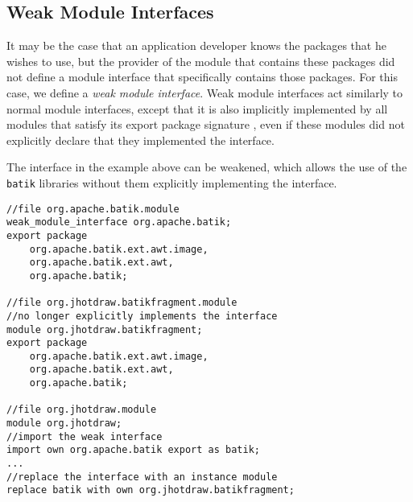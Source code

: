 \subsection{Weak Module Interfaces}

It may be the case that an application developer knows the packages that
he wishes to use, but the provider of the module that contains these packages 
did not define a module interface that specifically contains those packages. For
this case, we define a \textit{weak module interface}. Weak module interfaces act similarly
to normal module interfaces, except that it is also implicitly implemented
by all modules that satisfy its export package signature \cite{mcdirmid01jiazzi, componentnextgen}, 
even if these modules did not explicitly declare that they implemented the interface.

The interface in the example above can be weakened, which allows the use
of the \texttt{batik} libraries without them explicitly implementing the interface.

\begin{lstlisting}[caption=Weak Interfaces]
//file org.apache.batik.module
weak_module_interface org.apache.batik;
export package 
	org.apache.batik.ext.awt.image,
	org.apache.batik.ext.awt,	
	org.apache.batik;

//file org.jhotdraw.batikfragment.module
//no longer explicitly implements the interface
module org.jhotdraw.batikfragment;
export package 
	org.apache.batik.ext.awt.image,
	org.apache.batik.ext.awt, 
	org.apache.batik;
	
//file org.jhotdraw.module
module org.jhotdraw;
//import the weak interface 
import own org.apache.batik export as batik;
...
//replace the interface with an instance module
replace batik with own org.jhotdraw.batikfragment; 
\end{lstlisting}

%





